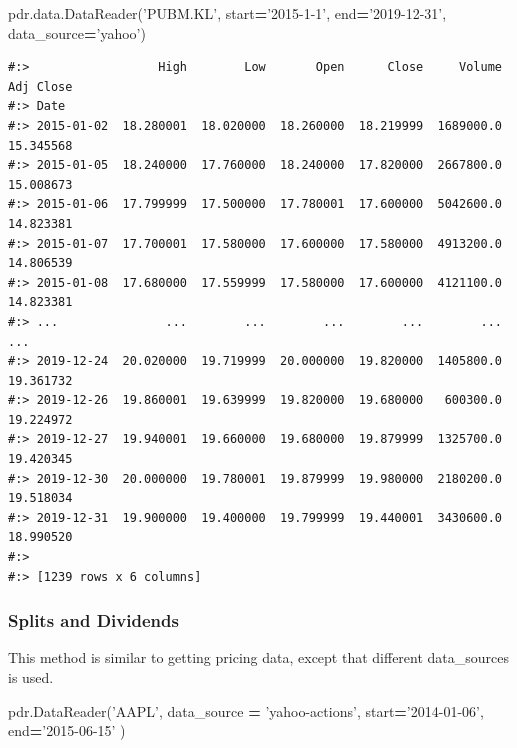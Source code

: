 \documentclass[
]{book}
\newenvironment{Shaded}{\begin{snugshade}}{\end{snugshade}}
\newcommand{\NormalTok}[1]{#1}
\newcommand{\OperatorTok}[1]{\textcolor[rgb]{0.43,0.43,0.43}{\textbf{#1}}}
\newcommand{\StringTok}[1]{\textcolor[rgb]{0.5,0.5,0.5}{#1}}
\begin{document}
\begin{Shaded}
\begin{Highlighting}[]
\NormalTok{pdr.data.DataReader(}\StringTok{'PUBM.KL'}\NormalTok{,}
\NormalTok{                    start}\OperatorTok{=}\StringTok{'2015-1-1'}\NormalTok{, }
\NormalTok{                    end}\OperatorTok{=}\StringTok{'2019-12-31'}\NormalTok{, }
\NormalTok{                    data_source}\OperatorTok{=}\StringTok{'yahoo'}\NormalTok{)}
\end{Highlighting}
\end{Shaded}

\begin{verbatim}
#:>                  High        Low       Open      Close     Volume  Adj Close
#:> Date                                                                        
#:> 2015-01-02  18.280001  18.020000  18.260000  18.219999  1689000.0  15.345568
#:> 2015-01-05  18.240000  17.760000  18.240000  17.820000  2667800.0  15.008673
#:> 2015-01-06  17.799999  17.500000  17.780001  17.600000  5042600.0  14.823381
#:> 2015-01-07  17.700001  17.580000  17.600000  17.580000  4913200.0  14.806539
#:> 2015-01-08  17.680000  17.559999  17.580000  17.600000  4121100.0  14.823381
#:> ...               ...        ...        ...        ...        ...        ...
#:> 2019-12-24  20.020000  19.719999  20.000000  19.820000  1405800.0  19.361732
#:> 2019-12-26  19.860001  19.639999  19.820000  19.680000   600300.0  19.224972
#:> 2019-12-27  19.940001  19.660000  19.680000  19.879999  1325700.0  19.420345
#:> 2019-12-30  20.000000  19.780001  19.879999  19.980000  2180200.0  19.518034
#:> 2019-12-31  19.900000  19.400000  19.799999  19.440001  3430600.0  18.990520
#:> 
#:> [1239 rows x 6 columns]
\end{verbatim}

\hypertarget{splits-and-dividends}{%
\subsubsection{Splits and Dividends}\label{splits-and-dividends}}

This method is similar to getting pricing data, except that different data\_sources is used.

\begin{Shaded}
\begin{Highlighting}[]
\NormalTok{pdr.DataReader(}\StringTok{'AAPL'}\NormalTok{,}
\NormalTok{  data_source }\OperatorTok{=} \StringTok{'yahoo-actions'}\NormalTok{,}
\NormalTok{  start}\OperatorTok{=}\StringTok{'2014-01-06'}\NormalTok{, }
\NormalTok{  end}\OperatorTok{=}\StringTok{'2015-06-15'}
\NormalTok{)}
\end{Highlighting}
\end{Shaded}
\end{document}
